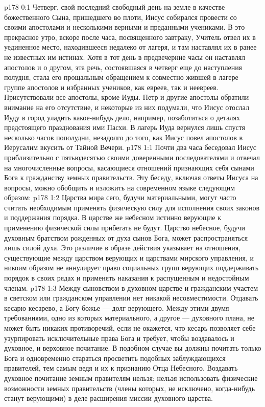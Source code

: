 \author{Комиссия срединников}
\vs p178 0:1 Четверг, свой последний свободный день на земле в качестве божественного Сына, пришедшего во плоти, Иисус собирался провести со своими апостолами и несколькими верными и преданными учениками. В это прекрасное утро, вскоре после часа, посвященного завтраку, Учитель отвел их в уединенное место, находившееся недалеко от лагеря, и там наставлял их в ранее не известных им истинах. Хотя в тот день в предвечерние часы он наставлял апостолов и о другом, эта речь, состоявшаяся в четверг еще до наступления полудня, стала его прощальным обращением к совместно жившей в лагере группе апостолов и избранных учеников, как евреев, так и неевреев. Присутствовали все апостолы, кроме Иуды. Петр и другие апостолы обратили внимание на его отсутствие, и некоторые из них подумали, что Иисус отослал Иуду в город уладить какое\hyp{}нибудь дело, например, позаботиться о деталях предстоящего празднования ими Пасхи. В лагерь Иуда вернулся лишь спустя несколько часов пополудни, незадолго до того, как Иисус повел апостолов в Иерусалим вкусить от Тайной Вечери.
\vs p178 1:1 Почти два часа беседовал Иисус приблизительно с пятьюдесятью своими доверенными последователями и отвечал на многочисленные вопросы, касающиеся отношений признающих себя сынами Бога к гражданству земных правительств. Эту беседу, включая ответы Иисуса на вопросы, можно обобщить и изложить на современном языке следующим образом:
\vs p178 1:2 \pc Царства мира сего, будучи материальными, могут часто считать необходимым применять физическую силу для исполнения своих законов и поддержания порядка. В царстве же небесном истинно верующие к применению физической силы прибегать не будут. Царство небесное, будучи духовным братством рожденных от духа сынов Бога, может распространяться лишь силой духа. Это различие в образе действия указывает на отношения, существующие между царством верующих и царствами мирского управления, и никоим образом не аннулирует право социальных групп верующих поддерживать порядок в своих рядах и применять наказания к распущенным и недостойным членам.
\vs p178 1:3 Между сыновством в духовном царстве и гражданским участем в светском или гражданском управлении нет никакой несовместимости. Отдавать кесарю кесарево, а Богу божье --- долг верующего. Между этими двумя требованиями, одно из которых материального, а другое --- духовного плана, не может быть никаких противоречий, если не окажется, что кесарь позволяет себе узурпировать исключительные права Бога и требует, чтобы воздавалось и духовное, и верховное почитание. В подобном случае вы должны почитать только Бога и одновременно стараться просветить подобных заблуждающихся правителей, тем самым ведя и их к признанию Отца Небесного. Воздавать духовное почитание земным правителям нельзя; нельзя использовать физические возможности земных правительств (члены которых, не исключено, когда\hyp{}нибудь станут верующими) в деле расширения миссии духовного царства.
